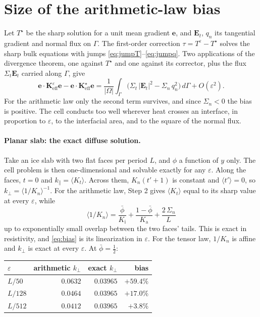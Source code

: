 \documentclass[11pt]{article}
\newcommand{\Om}{\Omega}
\newcommand{\Gam}{\Gamma}
\newcommand{\be}{\mathbf e}
\newcommand{\Keff}{\mathbf{K}_{\mathrm{eff}}}
\newcommand{\Ka}{K_{\mathrm a}}
\newcommand{\Ki}{K_{\mathrm i}}
\newcommand{\Kt}{K_{t}}
\newcommand{\Kn}{K_{n}}
\newcommand{\avg}[1]{\big\langle #1 \big\rangle}
\begin{document}
\section{Size of the arithmetic-law bias}
\label{sec:size}

Let $T^\star$ be the sharp solution for a unit mean gradient $\be$, and
$\mathbf E_t$, $q_n$ its tangential gradient and normal flux on $\Gam$. The
first-order correction $\tau=T^\varepsilon-T^\star$ solves the sharp bulk
equations with jumps \eqref{eq:jumpT}--\eqref{eq:jumpq}. Two applications of
the divergence theorem, one against $T^\star$ and one against its corrector,
plus the flux $\Sigma_t\mathbf E_t$ carried along $\Gam$, give
\begin{equation}
\be\cdot\Keff^{\varepsilon}\be-\be\cdot\Keff^{\star}\be
=\frac{1}{|\Om|}\int_\Gam\Big(\Sigma_t\,|\mathbf E_t|^2-\Sigma_n\,q_n^2\Big)\,d\Gam
+O(\varepsilon^2).
\label{eq:bias}
\end{equation}
For the arithmetic law only the second term survives, and since $\Sigma_n<0$
the bias is positive. The cell conducts too well wherever heat crosses an
interface, in proportion to $\varepsilon$, to the interfacial area, and to the
square of the normal flux.

\paragraph{Planar slab: the exact diffuse solution.} Take an ice slab with
two flat faces per period $L$, and $\phi$ a function of $y$ only. The
cell problem is then one-dimensional and solvable exactly for any $\varepsilon$.
Along the faces, $t=0$ and $k_\parallel=\avg{\Kt}$. Across them,
$\Kn(t'+1)$ is constant and $\avg{t'}=0$, so $k_\perp=\avg{1/\Kn}^{-1}$. For
the arithmetic law, Step 2 gives $\avg{\Kt}$ equal to its sharp value at every
$\varepsilon$, while
\begin{equation}
\avg{1/\Kn}=\frac{\bar\phi}{\Ki}+\frac{1-\bar\phi}{\Ka}+\frac{2\,\Sigma_n}{L}
\label{eq:slab}
\end{equation}
up to exponentially small overlap between the two faces' tails. This is exact
in resistivity, and \eqref{eq:bias} is its linearization in $\varepsilon$. For the tensor law, $1/\Kn$ is affine and
$k_\perp$ is exact at every $\varepsilon$. At $\bar\phi=\tfrac12$:

\begin{center}
\begin{tabular}{@{}lrrr@{}}
\toprule
$\varepsilon$ & arithmetic $k_\perp$ & exact $k_\perp$ & bias\\
\midrule
$L/50$  & $0.0632$ & $0.03965$ & $+59.4\%$\\
$L/128$ & $0.0464$ & $0.03965$ & $+17.0\%$\\
$L/512$ & $0.0412$ & $0.03965$ & $+3.8\%$\\
\bottomrule
\end{tabular}
\end{center}
\end{document}
